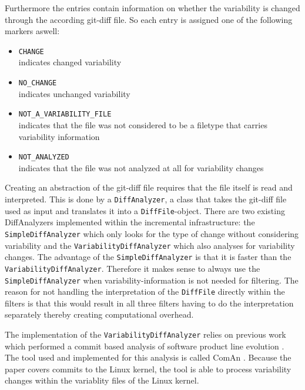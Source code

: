 \documentclass[a4paper]{article}
\begin{document}
Furthermore the entries contain information on whether the variability is changed through the according git-diff file. So each entry is assigned one of the following markers aswell:

\begin{itemize}
	\item \texttt{CHANGE} \\
	      indicates changed variability
	\item \texttt{NO\_CHANGE} \\
	      indicates unchanged variability
	\item \texttt{NOT\_A\_VARIABILITY\_FILE}\\
	      indicates that the file was not considered to be a filetype that carries variability information
	\item \texttt{NOT\_ANALYZED}\\
	      indicates that the file was not analyzed at all for variability changes
\end{itemize}

Creating an abstraction of the git-diff file requires that the file itself is read and interpreted. This is done by a \texttt{DiffAnalyzer}, a class that takes the git-diff file used as input and translates it into a \texttt{DiffFile}-object. There are two existing DiffAnalyzers implemented within the incremental infrastructure: the \texttt{SimpleDiffAnalyzer} which only looks for the type of change without considering variability and the \texttt{VariabilityDiffAnalyzer} which also analyses for variability changes. The advantage of the \texttt{SimpleDiffAnalyzer} is that it is faster than the \texttt{VariabilityDiffAnalyzer}. 
Therefore it makes sense to always use the \texttt{SimpleDiffAnalyzer} when variability-information is not needed for filtering. The reason for not handling the interpretation of the \texttt{DiffFile} directly within the filters is that this would result in all three filters having to do the interpretation separately thereby creating computational overhead.

The implementation of the \texttt{VariabilityDiffAnalyzer} relies on previous work which performed a commit based analysis of software product line evolution \cite{ComAn}. The tool used and implemented for this analysis  is called ComAn \cite{ComAn-tool}. Because the paper covers commits to the Linux kernel, the tool is able to process variability changes within the variablity files of the Linux kernel. 
\end{document}
